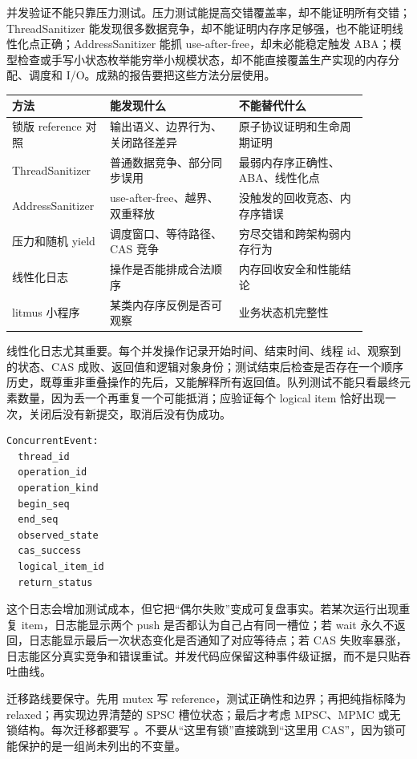并发验证不能只靠压力测试。压力测试能提高交错覆盖率，却不能证明所有交错；ThreadSanitizer 能发现很多数据竞争，却不能证明内存序足够强，也不能证明线性化点正确；AddressSanitizer 能抓 use-after-free，却未必能稳定触发 ABA；模型检查或手写小状态枚举能穷举小规模状态，却不能直接覆盖生产实现的内存分配、调度和 I/O。成熟的报告要把这些方法分层使用。

\begin{center}
\small
\begin{tabular}{@{}p{0.20\linewidth}p{0.34\linewidth}p{0.34\linewidth}@{}}
\toprule
方法 & 能发现什么 & 不能替代什么 \\
\midrule
锁版 reference 对照 & 输出语义、边界行为、关闭路径差异 & 原子协议证明和生命周期证明 \\
ThreadSanitizer & 普通数据竞争、部分同步误用 & 最弱内存序正确性、ABA、线性化点 \\
AddressSanitizer & use-after-free、越界、双重释放 & 没触发的回收竞态、内存序错误 \\
压力和随机 yield & 调度窗口、等待路径、CAS 竞争 & 穷尽交错和跨架构弱内存行为 \\
线性化日志 & 操作是否能排成合法顺序 & 内存回收安全和性能结论 \\
litmus 小程序 & 某类内存序反例是否可观察 & 业务状态机完整性 \\
\bottomrule
\end{tabular}
\end{center}

线性化日志尤其重要。每个并发操作记录开始时间、结束时间、线程 id、观察到的状态、CAS 成败、返回值和逻辑对象身份；测试结束后检查是否存在一个顺序历史，既尊重非重叠操作的先后，又能解释所有返回值。队列测试不能只看最终元素数量，因为丢一个再重复一个可能抵消；应验证每个 logical item 恰好出现一次，关闭后没有新提交，取消后没有伪成功。

\begin{lstlisting}[numbers=none,caption={并发操作日志的最小字段}]
ConcurrentEvent:
  thread_id
  operation_id
  operation_kind
  begin_seq
  end_seq
  observed_state
  cas_success
  logical_item_id
  return_status
\end{lstlisting}

这个日志会增加测试成本，但它把“偶尔失败”变成可复盘事实。若某次运行出现重复 item，日志能显示两个 push 是否都认为自己占有同一槽位；若 wait 永久不返回，日志能显示最后一次状态变化是否通知了对应等待点；若 CAS 失败率暴涨，日志能区分真实竞争和错误重试。并发代码应保留这种事件级证据，而不是只贴吞吐曲线。

迁移路线要保守。先用 mutex 写 reference，测试正确性和边界；再把纯指标降为 relaxed；再实现边界清楚的 SPSC 槽位状态；最后才考虑 MPSC、MPMC 或无锁结构。每次迁移都要写 。不要从“这里有锁”直接跳到“这里用 CAS”，因为锁可能保护的是一组尚未列出的不变量。

